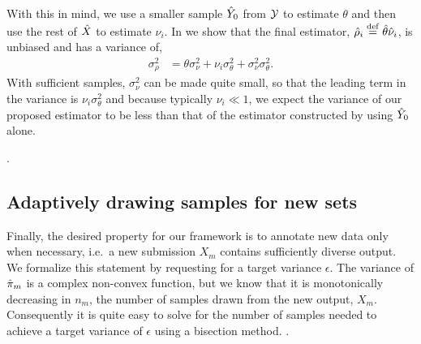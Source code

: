With this in mind, we use a smaller sample ${\hat{Y}}_0$ from $\mathcal{Y}$ to estimate $\theta$ and then use the rest of ${\hat{X}}$ to estimate $\nu_i$.
In  we show that the final estimator, ${\hat{\rho}}_i \stackrel{\rm def}{=} {\hat{\theta}} {\hat{\nu}}_i$, is unbiased and has a variance of,
\begin{align*}
  \sigma^2_\rho &= \theta \sigma^2_\nu + \nu_i \sigma^2_\theta + \sigma^2_\nu \sigma^2_\theta.
\end{align*}
With sufficient samples, $\sigma^2_\nu$ can be made quite small, so that the leading term in the variance is $\nu_i \sigma^2_\theta$ and because typically $\nu_i \ll 1$, we expect the variance of our proposed estimator to be less than that of the estimator constructed by using ${\hat{Y}}_0$ alone.

.

\subsection{Adaptively drawing samples for new sets}
Finally, the desired property for our framework is to annotate new data only when necessary, i.e.\ a new submission $X_m$ contains sufficiently diverse output.
We formalize this statement by requesting for a target variance $\epsilon$.
The variance of ${\hat{\pi}}_m$ is a complex non-convex function, but we know that it is monotonically decreasing in $n_m$, the number of samples drawn from the new output, $X_m$.
Consequently it is quite easy to solve for the number of samples needed to achieve a target variance of $\epsilon$ using a bisection method.
.

